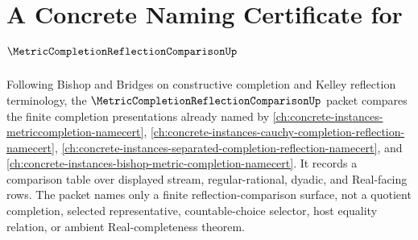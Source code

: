 \chapter{A Concrete Naming Certificate for $\MetricCompletionReflectionComparisonUp$}
\label{ch:concrete-instances-metric-completion-reflection-comparison-namecert}

Following Bishop and Bridges on constructive completion and Kelley reflection terminology, the $\MetricCompletionReflectionComparisonUp$ packet compares the finite completion presentations already named by \autoref{ch:concrete-instances-metriccompletion-namecert}, \autoref{ch:concrete-instances-cauchy-completion-reflection-namecert}, \autoref{ch:concrete-instances-separated-completion-reflection-namecert}, and \autoref{ch:concrete-instances-bishop-metric-completion-namecert}. It records a comparison table over displayed stream, regular-rational, dyadic, and Real-facing rows. The packet names only a finite reflection-comparison surface, not a quotient completion, selected representative, countable-choice selector, host equality relation, or ambient Real-completeness theorem.

